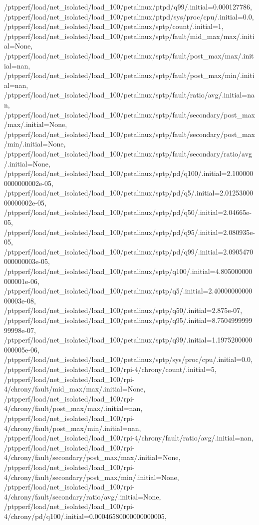{    /ptpperf/load/net_isolated/load_100/petalinux/ptpd/q99/.initial=0.000127786,
    /ptpperf/load/net_isolated/load_100/petalinux/ptpd/sys/proc/cpu/.initial=0.0,
    /ptpperf/load/net_isolated/load_100/petalinux/sptp/count/.initial=1,
    /ptpperf/load/net_isolated/load_100/petalinux/sptp/fault/mid_max/max/.initial=None,
    /ptpperf/load/net_isolated/load_100/petalinux/sptp/fault/post_max/max/.initial=nan,
    /ptpperf/load/net_isolated/load_100/petalinux/sptp/fault/post_max/min/.initial=nan,
    /ptpperf/load/net_isolated/load_100/petalinux/sptp/fault/ratio/avg/.initial=nan,
    /ptpperf/load/net_isolated/load_100/petalinux/sptp/fault/secondary/post_max/max/.initial=None,
    /ptpperf/load/net_isolated/load_100/petalinux/sptp/fault/secondary/post_max/min/.initial=None,
    /ptpperf/load/net_isolated/load_100/petalinux/sptp/fault/secondary/ratio/avg/.initial=None,
    /ptpperf/load/net_isolated/load_100/petalinux/sptp/pd/q100/.initial=2.1000000000000002e-05,
    /ptpperf/load/net_isolated/load_100/petalinux/sptp/pd/q5/.initial=2.0125300000000002e-05,
    /ptpperf/load/net_isolated/load_100/petalinux/sptp/pd/q50/.initial=2.04665e-05,
    /ptpperf/load/net_isolated/load_100/petalinux/sptp/pd/q95/.initial=2.080935e-05,
    /ptpperf/load/net_isolated/load_100/petalinux/sptp/pd/q99/.initial=2.0905470000000003e-05,
    /ptpperf/load/net_isolated/load_100/petalinux/sptp/q100/.initial=4.805000000000001e-06,
    /ptpperf/load/net_isolated/load_100/petalinux/sptp/q5/.initial=2.4000000000000003e-08,
    /ptpperf/load/net_isolated/load_100/petalinux/sptp/q50/.initial=2.875e-07,
    /ptpperf/load/net_isolated/load_100/petalinux/sptp/q95/.initial=8.750499999999998e-07,
    /ptpperf/load/net_isolated/load_100/petalinux/sptp/q99/.initial=1.1975200000000005e-06,
    /ptpperf/load/net_isolated/load_100/petalinux/sptp/sys/proc/cpu/.initial=0.0,
    /ptpperf/load/net_isolated/load_100/rpi-4/chrony/count/.initial=5,
    /ptpperf/load/net_isolated/load_100/rpi-4/chrony/fault/mid_max/max/.initial=None,
    /ptpperf/load/net_isolated/load_100/rpi-4/chrony/fault/post_max/max/.initial=nan,
    /ptpperf/load/net_isolated/load_100/rpi-4/chrony/fault/post_max/min/.initial=nan,
    /ptpperf/load/net_isolated/load_100/rpi-4/chrony/fault/ratio/avg/.initial=nan,
    /ptpperf/load/net_isolated/load_100/rpi-4/chrony/fault/secondary/post_max/max/.initial=None,
    /ptpperf/load/net_isolated/load_100/rpi-4/chrony/fault/secondary/post_max/min/.initial=None,
    /ptpperf/load/net_isolated/load_100/rpi-4/chrony/fault/secondary/ratio/avg/.initial=None,
    /ptpperf/load/net_isolated/load_100/rpi-4/chrony/pd/q100/.initial=0.00046580000000000005,
}
